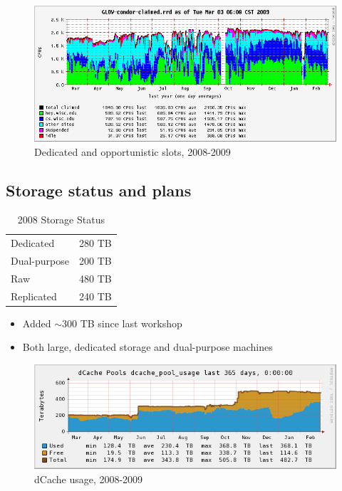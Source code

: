 \documentclass{beamer}
\newcommand{\ca}{\ensuremath{\sim}}
\begin{document}
\begin{frame}
\begin{figure}
    \includegraphics[width=\textwidth]{Graphics/GLOW-condor-claimed-1yr.png}
    \caption{Dedicated and opportunistic slots, 2008-2009}
\end{figure}
\end{frame}

\subsection{Storage status and plans}
\begin{frame}
\begin{table}
\begin{tabular}{lr}
    \toprule
    Dedicated       &   280 TB \\   %
    Dual-purpose    &   200 TB \\   %
    \midrule
    Raw             &   480 TB \\
    Replicated      &   240 TB \\
    \bottomrule
\end{tabular}
\caption{2008 Storage Status}
\label{2008_storage_status}
\end{table}

\begin{itemize}
    \item Added \ca{}300 TB since last workshop
    \item Both large, dedicated storage and dual-purpose machines
\end{itemize}
\end{frame}

\begin{frame}
\begin{figure}
    \includegraphics[width=\textwidth]{Graphics/dcache-usage-1yr.png}
    \caption{dCache usage, 2008-2009}
\end{figure}
\end{frame}
\end{document}

